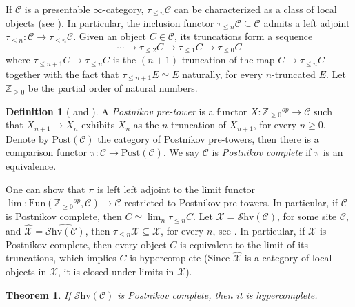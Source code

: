 \documentclass[10pt]{amsart}
\newcommand{\C}{\mathscr{C}}
\newcommand{\X}{\mathscr{X}}
\newcommand{\bZ}{\mathbb{Z}}
\newcommand{\Fun}{\mathrm{Fun}}
\newcommand{\Shv}{\mathscr{S}\mathrm{hv}}
\newcommand{\pos}{\mathrm{Post}}
\newtheorem{theorem}[equation]{Theorem}
\theoremstyle{definition}
\newtheorem{definition}[equation]{Definition}
\theoremstyle{remark}
\numberwithin{equation}{section}
\begin{document}
If $\C$ is a presentable $\infty$-category, $\tau_{\leq n}\C$ can be characterized as a class of local objects (see \cite[Proposition 5.5.6.18]{lurie2009htt}). In particular, the inclusion functor $\tau_{\leq n}\C\subseteq\C$ admits a left adjoint $\tau_{\leq n}:\C\to\tau_{\leq n}\C$. Given an object $C\in\C$, its truncations form a sequence 
\begin{equation}
	\cdots\to\tau_{\leq2}C\to\tau_{\leq1}C\to\tau_{\leq0}C
\end{equation}
where $\tau_{\leq n+1}C\to\tau_{\leq n}C$ is the $(n+1)$-truncation of the map $C\to\tau_{\leq n}C$ together with the fact that $\tau_{\leq n+1}E\simeq E$ naturally, for every $n$-truncated $E$. Let $\bZ_{\geq0}$ be the partial order of natural numbers. 
\begin{definition}[{\cite[Definition A.7.2.1]{lurie2018sag} and \cite[Definition 5.5.6.23]{lurie2009htt}}]
	A \emph{Postnikov pre-tower} is a functor $X:\bZ_{\geq0}{}^{op}\to\C$ such that $X_{n+1}\to X_n$ exhibits $X_n$ as the $n$-truncation of $X_{n+1}$, for every $n\geq0$. Denote by $\pos(\C)$ the category of Postnikov pre-towers, then there is a comparison functor $\pi:\C\to\pos(\C)$. We say $\C$ is \emph{Postnikov complete} if $\pi$ is an equivalence. 
\end{definition}One can show that $\pi$ is left left adjoint to the limit functor $\lim:\Fun(\bZ_{\geq0}{}^{op},\C)\to\C$ restricted to Postnikov pre-towers. In particular, if $\C$ is Postnikov complete, then $C\simeq\lim_n\tau_{\leq n}C$. Let $\X=\Shv(\C)$, for some site $\C$, and $\widehat{\X}=\widehat{\Shv(\C)}$, then $\tau_{\leq n}\X\subseteq\widehat{\X}$, for every $n$, see \cite[Lemma 6.5.2.9]{lurie2009htt}. In particular, if $\X$ is Postnikov complete, then every object $C$ is equivalent to the limit of its truncations, which implies $C$ is hypercomplete (Since $\widehat{\X}$ is a category of local objects in $\X$, it is closed under limits in $\X$).
\begin{theorem}
	If $\Shv(\C)$ is Postnikov complete, then it is hypercomplete. 
\end{theorem} 


{\footnotesize


}
\end{document}
